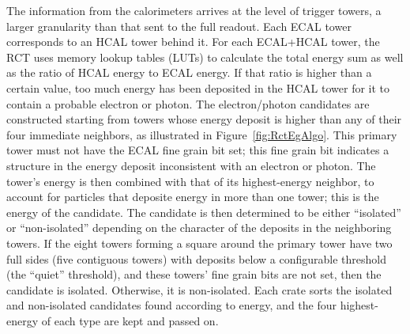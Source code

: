 The information from the calorimeters arrives at the level of trigger towers, 
a larger granularity than that sent to the full readout.  
Each ECAL tower corresponds to an HCAL tower behind it.  
For each ECAL+HCAL tower, the RCT uses memory lookup tables (LUTs) to 
calculate the total energy sum 
as well as the ratio of HCAL energy to ECAL energy.  
If that ratio is higher than a certain value, 
too much energy has been deposited in the HCAL tower for it to 
contain a probable electron or photon.  
The electron/photon candidates are constructed starting from 
towers whose energy deposit is higher than any of their 
four immediate neighbors, 
as illustrated in Figure~\ref{fig:RctEgAlgo}.  
This primary tower must not have the ECAL fine grain bit set; 
this fine grain bit indicates a structure in the energy deposit 
inconsistent with an electron or photon.  
The tower's energy is then combined with that of its highest-energy 
neighbor, to account for particles that deposite energy 
in more than one tower; 
this is the energy of the candidate.  
The candidate is then determined to be either ``isolated'' or 
``non-isolated'' depending on the character of the deposits 
in the neighboring towers.  
If the eight towers forming a square around the primary tower 
have two full sides (five contiguous towers) with 
deposits below a configurable threshold (the ``quiet'' threshold), 
and these towers' fine grain bits are not set, 
then the candidate is isolated.  
Otherwise, it is non-isolated.  
Each crate sorts the isolated and non-isolated candidates found 
according to energy, 
and the four highest-energy of each type are kept and passed on.  

